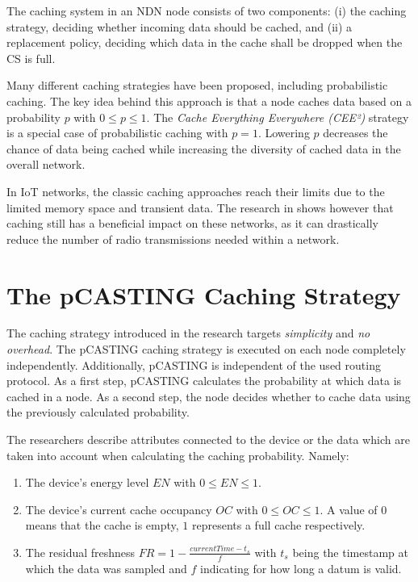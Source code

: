 \documentclass[conference]{IEEEtran}
\begin{document}
The caching system in an NDN node consists of two components: (i) the caching strategy, deciding whether incoming data should be cached, and (ii) a replacement policy, deciding which data in the cache shall be dropped when the CS is full.

Many different caching strategies have been proposed, including probabilistic caching\cite{Tarnoi2014}. The key idea behind this approach is that a node caches data based on a probability $p$ with $0 \leq p \leq 1$. The \textit{Cache Everything Everywhere (CEE²)} strategy is a special case of probabilistic caching with $p = 1$. Lowering $p$ decreases the chance of data being cached while increasing the diversity of cached data in the overall network.

In IoT networks, the classic caching approaches reach their limits due to the limited memory space and transient data. The research in \cite{Baccelli2014} shows however that caching still has a beneficial impact on these networks, as it can drastically reduce the number of radio transmissions needed within a network.

\section{The pCASTING Caching Strategy}
\label{sec:pcasting}

The caching strategy introduced in the research targets \textit{simplicity} and \textit{no overhead}. The pCASTING caching strategy is executed on each node completely independently. Additionally, pCASTING is independent of the used routing protocol\cite{Amadeo2014}. As a first step, pCASTING calculates the probability at which data is cached in a node. As a second step, the node decides whether to cache data using the previously calculated probability.

The researchers describe attributes connected to the device or the data which are taken into account when calculating the caching probability. Namely:
\begin{enumerate}
	\item The device's energy level $EN$ with $0 \leq EN \leq 1$.
	\item The device's current cache occupancy $OC$ with $0 \leq OC \leq 1$. A value of $0$ means that the cache is empty, $1$ represents a full cache respectively.
	\item The residual freshness $FR = 1 - \frac{currentTime - t_s}{f}$ with $t_s$ being the timestamp at which the data was sampled and $f$ indicating for how long a datum is valid.
\end{enumerate}
\end{document}
